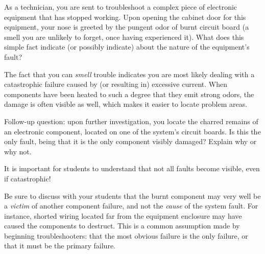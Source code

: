 

As a technician, you are sent to troubleshoot a complex piece of electronic equipment that has stopped working.  Upon opening the cabinet door for this equipment, your nose is greeted by the pungent odor of burnt circuit board (a smell you are unlikely to forget, once having experienced it).  What does this simple fact indicate (or possibly indicate) about the nature of the equipment's fault?







The fact that you can {\it smell} trouble indicates you are most likely dealing with a catastrophic failure caused by (or resulting in) excessive current.  When components have been heated to such a degree that they emit strong odors, the damage is often visible as well, which makes it easier to locate problem areas.

\vskip 10pt

Follow-up question: upon further investigation, you locate the charred remains of an electronic component, located on one of the system's circuit boards.  Is this the only fault, being that it is the only component visibly damaged?  Explain why or why not.







It is important for students to understand that not all faults become visible, even if catastrophic!

Be sure to discuss with your students that the burnt component may very well be a {\it victim} of another component failure, and not the {\it cause} of the system fault.  For instance, shorted wiring located far from the equipment enclosure may have caused the components to destruct.  This is a common assumption made by beginning troubleshooters: that the most obvious failure is the only failure, or that it must be the primary failure.





